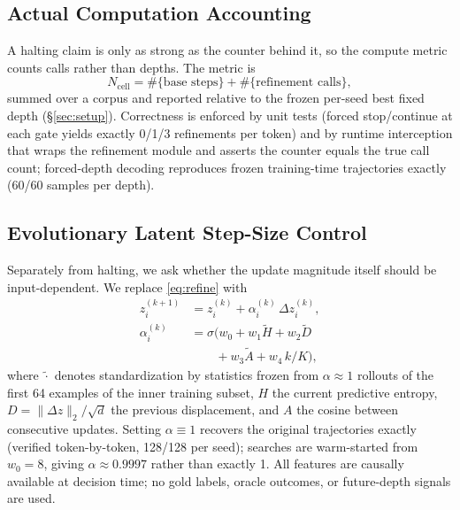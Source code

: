 ﻿\documentclass[11pt]{article}
\begin{document}
\subsection{Actual Computation Accounting}
\label{sec:ncell}
A halting claim is only as strong as the counter behind it, so the compute metric counts calls rather than depths. The metric is
\begin{equation}
N_{\mathrm{cell}} = \#\{\text{base steps}\} + \#\{\text{refinement calls}\},
\label{eq:ncell}
\end{equation}
summed over a corpus and reported relative to the frozen per-seed best fixed depth (\S\ref{sec:setup}). Correctness is enforced by unit tests (forced stop/continue at each gate yields exactly 0/1/3 refinements per token) and by runtime interception that wraps the refinement module and asserts the counter equals the true call count; forced-depth decoding reproduces frozen training-time trajectories exactly (60/60 samples per depth).

\subsection{Evolutionary Latent Step-Size Control}
\label{sec:alpha}
Separately from halting, we ask whether the update magnitude itself should be input-dependent. We replace \eqref{eq:refine} with
\begin{equation}
\begin{aligned}
z_i^{(k+1)} &= z_i^{(k)} + \alpha_i^{(k)}\,\Delta z_i^{(k)},\\
\alpha_i^{(k)} &= \sigma\!\big(w_0 + w_1 \tilde H + w_2 \tilde D\\
 &\qquad + w_3 \tilde A + w_4\, k/K\big),
\end{aligned}
\label{eq:alpha}
\end{equation}
where $\tilde\cdot$ denotes standardization by statistics frozen from $\alpha{\approx}1$ rollouts of the first 64 examples of the inner training subset, $H$ the current predictive entropy, $D = \lVert\Delta z\rVert_2/\sqrt{d}$ the previous displacement, and $A$ the cosine between consecutive updates. Setting $\alpha \equiv 1$ recovers the original trajectories exactly (verified token-by-token, 128/128 per seed); searches are warm-started from $w_0 = 8$, giving $\alpha \approx 0.9997$ rather than exactly 1. All features are causally available at decision time; no gold labels, oracle outcomes, or future-depth signals are used.
\end{document}
